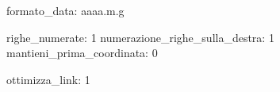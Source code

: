 formato_data: aaaa.m.g

righe_numerate:                 1
numerazione_righe_sulla_destra: 1
mantieni_prima_coordinata:      0

ottimizza_link: 1
